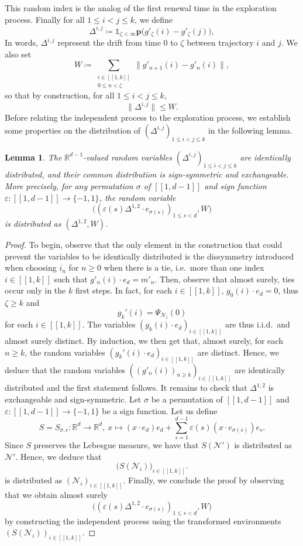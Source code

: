 \documentclass[a4paper, 11pt]{article}
\theoremstyle{plain}
\newtheorem{Lemma}[Theorem]{Lemma}
\theoremstyle{definition}
\newcommand{\R}{\mathbb{R}}
\newcommand{\range}[2]{[\![#1,#2]\!]}
\numberwithin{equation}{section}
\begin{document}
This random index is the analog of the first renewal time in the exploration process. Finally for all $1\leq i<j\leq k$, we define
    \[\Delta^{i,j}\coloneqq\mathds 1_{\zeta<\infty} \mathbf p\big(g'_\zeta(i)-g'_\zeta(j)\big),\]
In words, $\Delta^{i,j}$ represent the drift from time $0$ to $\zeta$ between trajectory $i$ and $j$. We also set
    \[W\coloneqq\sum_{\substack{i\in\range{1}{k}\\0\leq n<\zeta}}\|g'_{n+1}(i)-g'_n(i)\|,\]
so that by construction, for all $1\leq i<j\leq k$,
    \[\|\Delta^{i, j}\|\leq W.\]
Before relating the independent process to the exploration process, we establish some properties on the distribution of $(\Delta^{i, j})_{1\leq i<j\leq k}$ in the following lemma. 


\begin{Lemma}
    \label{lemma_Delta}
    The $\R^{d-1}$-valued random variables $(\Delta^{i, j})_{1\leq i<j\leq k}$ are identically distributed, and their common distribution is sign-symmetric and exchangeable. More precisely, for any permutation $\sigma$ of $\range{1}{d-1}$ and sign function $\varepsilon:\range{1}{d-1}\to\{-1,1\}$, the random variable
        \[\big((\varepsilon(s)\Delta^{1,2}\cdot e_{\sigma(s)})_{1\leq s<d}, W\big)\]
    is distributed as $(\Delta^{1,2}, W)$.
\end{Lemma}

\begin{proof}
    To begin, observe that the only element in the construction that could prevent the variables to be identically distributed is the dissymmetry introduced when choosing $i_n$ for $n\geq0$ when there is a tie, i.e.\ more than one index $i\in\range{1}{k}$ such that $g'_n(i)\cdot e_d=m'_n$. Then, observe that almost surely, ties occur only in the $k$ first steps. In fact, for each $i\in\range{1}{k}$, $g_0(i)\cdot e_d=0$, thus $\zeta\geq k$ and 
        \[g_k'(i)=\Psi_{\mathcal N_i}(0)\]
    for each $i\in\range{1}{k}$. The variables $(g_k(i)\cdot e_d)_{i\in\range{1}{k}}$ are thus i.i.d.\ and almost surely distinct. By induction, we then get that, almost surely, for each $n\geq k$, the random variables $(g_k'(i)\cdot e_d)_{i\in\range{1}{k}}$ are distinct. Hence, we deduce that the random variables $((g'_n(i))_{n\geq k})_{i\in\range{1}{k}}$ are identically distributed and the first statement follows. It remains to check that $\Delta^{1,2}$ is exchangeable and sign-symmetric. Let $\sigma$ be a permutation of $\range{1}{d-1}$ and $\varepsilon:\range{1}{d-1}\to\{-1,1\}$ be a sign function. Let us define
        \[S=S_{\sigma,\epsilon}:\R^d\to\R^d,~x\mapsto (x\cdot e_d)e_d+\sum_{s=1}^{d-1} \varepsilon(s)(x\cdot e_{\sigma(s)})e_s.\]
    Since $S$ preserves the Lebesgue measure, we have that $S(\mathcal N')$ is distributed as $\mathcal N'$. Hence, we deduce that
        \[\big(S(\mathcal N_i)\big)_{i\in\range{1}{k}}.\]
    is distributed as $(\mathcal N_i)_{i\in\range{1}{k}}$. Finally, we conclude the proof by observing that we obtain almost surely
        \[\big((\varepsilon(s)\Delta^{1,2}\cdot e_{\sigma(s)})_{1\leq s<d}, W\big)\]
    by constructing the independent process using the transformed environments $(S(\mathcal N_i))_{i\in\range{1}{k}}$.
\end{proof}
\end{document}
